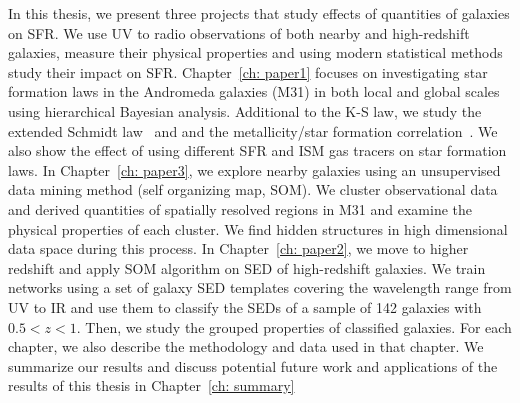In this thesis, we present three projects that study effects of quantities of galaxies on SFR.
We use UV to radio observations of both nearby and high-redshift galaxies, measure their physical properties and using modern statistical methods study their impact on SFR.
Chapter~\ref{ch: paper1} focuses on investigating star formation laws in the Andromeda galaxies (M31) in both local and global scales using hierarchical Bayesian analysis.
Additional to the K-S law, we study the extended Schmidt law~\citep{Shi11} and and the metallicity/star formation correlation~\citep{Krumholz09}.
We also show the effect of using different SFR and ISM gas tracers on star formation laws.
In Chapter~\ref{ch: paper3}, we explore nearby galaxies using an unsupervised data mining method (self organizing map, SOM).
We cluster observational data and derived quantities of spatially resolved regions in M31 and examine the physical properties of each cluster.
We find hidden structures in high dimensional data space during this process.
In Chapter~\ref{ch: paper2}, we move to higher redshift and apply SOM algorithm on SED of high-redshift galaxies.
We train networks using a set of galaxy SED templates covering the wavelength range from UV to IR and use them to classify the SEDs of a sample of 142 galaxies with $0.5 < z < 1$. 
Then, we study the grouped properties of classified galaxies.
For each chapter, we also describe the methodology and data used in that chapter.
We summarize our results and discuss potential future work and applications of the results of this thesis in Chapter~\ref{ch: summary}

 

